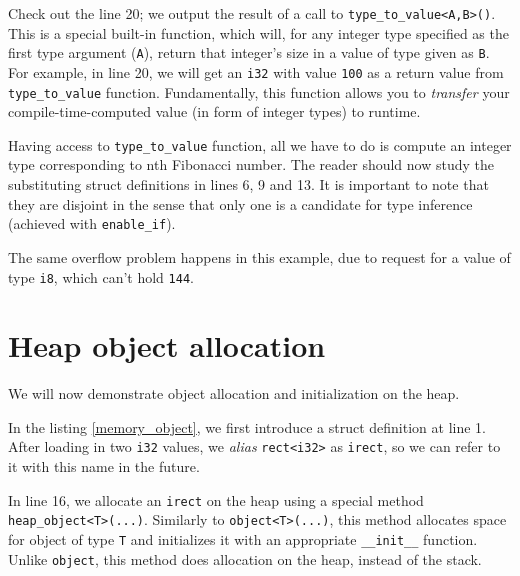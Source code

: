 \documentclass[times, utf8, diplomski]{fer}
\theoremstyle{definition}
\newcommand{\textcode}[3]{
    
}
\begin{document}
\textcode{\resdir/programs/fib_compile_time.agt}{fib_ct}{Compile-time Fibonacci}

Check out the line 20; we output the result of a call to \texttt{type\_to\_value<A,B>()}.
This is a special built-in function, which will, for any integer type specified as the first 
type argument (\texttt{A}), return that integer's size in a value of type given as \texttt{B}.
For example, in line 20, we will get an \texttt{i32} with value \texttt{100} as a return value
from \texttt{type\_to\_value} function. Fundamentally, this function allows you to \textit{transfer}
your compile-time-computed value (in form of integer types) to runtime.

Having access to \texttt{type\_to\_value} function, all we have to do is compute an integer
type corresponding to nth Fibonacci number. The reader should now study the substituting
struct definitions in lines 6, 9 and 13. It is important to note that they are disjoint in the sense
that only one is a candidate for type inference (achieved with \texttt{enable\_if}).

\textcode{\resdir/programs/fib_compile_time.out}{fib_ct_out}{Compile-time Fibonacci - output}

The same overflow problem happens in this example, due to request for a value of type \texttt{i8},
which can't hold \texttt{144}.


\section{Heap object allocation}

We will now demonstrate object allocation and initialization on the heap. 

\textcode{\resdir/programs/memory_object.agt}{memory_object}{Heap object allocation}
\textcode{\resdir/programs/memory_object.in}{memory_object_in}{Heap object allocation - input}
\textcode{\resdir/programs/memory_object.out}{memory_object_out}{Heap object allocation - output}

In the listing \ref{memory_object}, we first introduce a struct definition at line 1.
After loading in two \texttt{i32} values, we \textit{alias} \texttt{rect<i32>} as \texttt{irect},
so we can refer to it with this name in the future.

In line 16, we allocate an \texttt{irect} on the heap using a special method \texttt{heap\_object<T>(...)}.
Similarly to \texttt{object<T>(...)}, this method allocates space for object of type \texttt{T} and
initializes it with an appropriate \texttt{\_\_init\_\_} function. Unlike \texttt{object}, this method
does allocation on the heap, instead of the stack.
\end{document}
